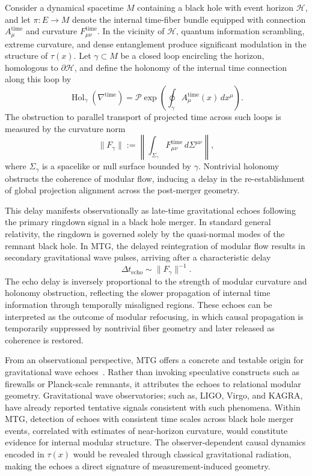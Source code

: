 \documentclass[11pt]{article}
\begin{document}
Consider a dynamical spacetime \( M \) containing a black hole with event horizon \( \mathcal{H} \), and let \( \pi: E \to M \) denote the internal time-fiber bundle equipped with connection \( A^{\mathrm{time}}_\mu \) and curvature \( F^{\mathrm{time}}_{\mu\nu} \). In the vicinity of \( \mathcal{H} \), quantum information scrambling, extreme curvature, and dense entanglement produce significant modulation in the structure of \( \tau(x) \). Let \( \gamma \subset M \) be a closed loop encircling the horizon, homologous to \( \partial \mathcal{H} \), and define the holonomy of the internal time connection along this loop by
\begin{equation}
\operatorname{Hol}_\gamma(\nabla^{\mathrm{time}}) = \mathcal{P} \exp\left( \oint_\gamma A^{\mathrm{time}}_\mu(x) \, dx^\mu \right).
\end{equation}
The obstruction to parallel transport of projected time across such loops is measured by the curvature norm
\begin{equation}
\|F_\gamma\| := \left\| \int_{\Sigma_\gamma} F^{\mathrm{time}}_{\mu\nu} \, d\Sigma^{\mu\nu} \right\|,
\end{equation}
where \( \Sigma_\gamma \) is a spacelike or null surface bounded by \( \gamma \). Nontrivial holonomy obstructs the coherence of modular flow, inducing a delay in the re-establishment of global projection alignment across the post-merger geometry.

This delay manifests observationally as late-time gravitational echoes following the primary ringdown signal in a black hole merger. In standard general relativity, the ringdown is governed solely by the quasi-normal modes of the remnant black hole. In MTG, the delayed reintegration of modular flow results in secondary gravitational wave pulses, arriving after a characteristic delay
\begin{equation}
\Delta t_{\text{echo}} \sim \|F_\gamma\|^{-1}.
\end{equation}
The echo delay is inversely proportional to the strength of modular curvature and holonomy obstruction, reflecting the slower propagation of internal time information through temporally misaligned regions. These echoes can be interpreted as the outcome of modular refocusing, in which causal propagation is temporarily suppressed by nontrivial fiber geometry and later released as coherence is restored.

From an observational perspective, MTG offers a concrete and testable origin for gravitational wave echoes~\cite{abedi2017echoes}. Rather than invoking speculative constructs such as firewalls or Planck-scale remnants, it attributes the echoes to relational modular geometry. Gravitational wave observatories; such as, LIGO, Virgo, and KAGRA, have already reported tentative signals consistent with such phenomena. Within MTG, detection of echoes with consistent time scales across black hole merger events, correlated with estimates of near-horizon curvature, would constitute evidence for internal modular structure. The observer-dependent causal dynamics encoded in \( \tau(x) \) would be revealed through classical gravitational radiation, making the echoes a direct signature of measurement-induced geometry.
\end{document}
